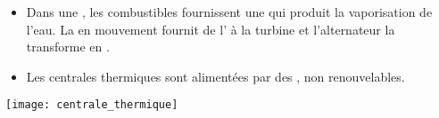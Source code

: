 \begin{mybilan}

	
	

	\begin{itemize}
		\item Dans une , les combustibles fournissent une  qui produit la vaporisation de l'eau. La  en mouvement fournit de l' à la turbine et l'alternateur la transforme en .
		\item Les centrales thermiques sont alimentées par des , non renouvelables. 
	\end{itemize}

	\begin{center}
		\texttt{[image: centrale\_thermique]}
	\end{center}
\end{mybilan}
